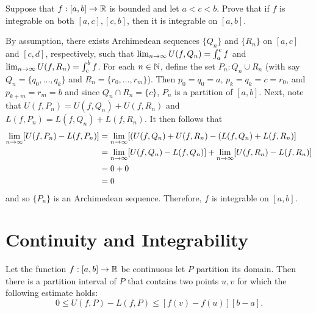 \documentclass[letterpaper, twoside, 12pt]{book}
\begin{document}
\begin{exercise}[6]
  Suppose that \(f:[a,b]\to\mathbb R\) is bounded and let \(a<c<b\). Prove that if
  \(f\) is integrable on both \([a,c],[c,b]\), then it is integrable on
  \([a,b]\).
\end{exercise}

\begin{solution}
    By assumption, there exists Archimedean sequences \(\{Q_n\}\) and \(\{R_n\}\) on
    \([a, c]\) and \([c, d]\), respectively, such that \(\lim_{n \to \infty} U(f, Q_n) = \int_a^c f\)
    and \(\lim_{n \to \infty} U(f, R_n) = \int_c^b f\). For each \(n \in \mathbb N\), define the
    set \(P_n : Q_n \cup R_n\) (with say \(Q_n = \{q_0, ..., q_k\}\) and 
    \(R_n = \{r_0, ..., r_m\}\)). Then \(p_0 = q_0 = a\), \(p_k = q_k = c = r_0\),
    and \(p_{k+m} = r_m = b\) and since \(Q_n \cap R_n = \{c\}\), \(P_n\) is 
    a partition of \([a,b]\). Next, note that \(U(f, P_n) = U(f, Q_n) + U(f, R_n)\)
    and \(L(f, P_n) = L(f, Q_n) + L(f, R_n)\). It then follows that
    \begin{align*}
        \lim_{n \to \infty} [ U(f, P_n) - L(f, P_n) ] &= \lim_{n \to \infty} [ (U(f, Q_n) + U(f, R_n) - (L(f, Q_n) + L(f, R_n) ] \\
                &= \lim_{n \to \infty} [U(f, Q_n) - L(f, Q_n)] + \lim_{n \to \infty} [U(f, R_n) - L(f, R_n)] \\
                &= 0 + 0 \\
                &= 0 \\
    \end{align*}
    and so \(\{P_n\}\) is an Archimedean sequence. Therefore, \(f\) is integrable on \([a,b]\).
\end{solution}




\section{Continuity and Integrability}


\begin{lemma}[6.17]
  Let the function \(f:[a,b]\to\mathbb R\) be continuous let \(P\) partition
  its domain. Then there is a partition interval of \(P\) that contains two
  points \(u,v\) for which the following estimate holds:
  \[
    0
      \leq
    U(f,P)-L(f,P)
      \leq
    [f(v)-f(u)][b-a]
  .\]
\end{lemma}
\end{document}

